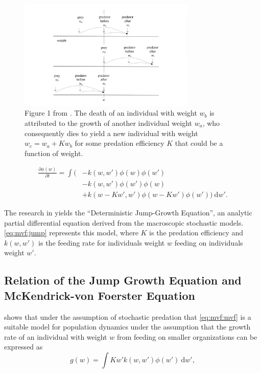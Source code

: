 \documentclass[../main.tex]{subfiles}
\begin{document}
  \begin{figure}
    \centering
    \includegraphics[width=0.75\textwidth]{img/stochastic_predation.png}
    \caption{Figure 1 from \cite{datta2010}. The death of an individual with weight $w_b$ is attributed to the growth of another individual weight $w_a$, who consequently dies to yield a new individual with weight $w_c = w_a + K w_b$ for some predation efficiency $K$ that could be a function of weight. \label{fig:mvf:predation}}
  \end{figure}

  \begin{align}\label{eq:mvf:jump}
    \frac{\partial \phi(w)}{\partial t}
    = \int ( &- k(w, w') \phi(w)\phi(w') \nonumber \\
    & - k(w, w')\phi(w')\phi(w) \nonumber \\
    & + k(w - Kw', w')\phi(w - Kw')\phi(w')) \: \mathrm{d}w'.
  \end{align}

  The research in \cite{datta2010} yields the ``Deterministic Jump-Growth Equation'', an analytic partial differential equation derived from the macroscopic stochastic models. \autoref{eq:mvf:jump} represents this model, where $K$ is the predation efficiency and $k(w, w')$ is the feeding rate for individuals weight $w$ feeding on individuals weight $w'$.

  \subsection{Relation of the Jump Growth Equation and McKendrick-von Foerster Equation}\label{sec:mvf:relation}
  \cite{law2009} shows that under the assumption of stochastic predation that \autoref{eq:mvf:mvf} is a suitable model for population dynamics under the assumption that the growth rate of an individual with weight $w$ from feeding on smaller organizations can be expressed as
  \begin{equation}\label{eq:mvf:growth}
    g(w) = \int K w' k(w, w') \phi(w') \: \mathrm{d}w',
  \end{equation}
\end{document}
